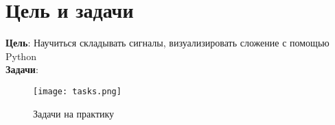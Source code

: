\chapter*{Цель и задачи}
\label{ch:intro}

\textbf{Цель}: Научиться складывать сигналы, визуализировать сложение с помощью Python
\\\textbf{Задачи}: \\

\begin{figure}[ht]
    \centering
    \texttt{[image: tasks.png]}
    \caption{Задачи на практику}
\end{figure}


\endinput